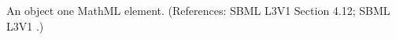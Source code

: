 An \EventAssignment object  one MathML 
element.  (References: SBML L3V1 Section 4.12; SBML L3V1 .)
